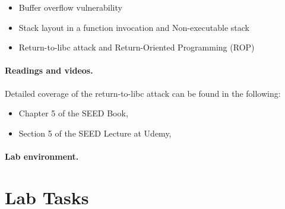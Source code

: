 \begin{itemize}[noitemsep]
\item Buffer overflow vulnerability
\item Stack layout in a function invocation and Non-executable stack 
\item Return-to-libc attack and Return-Oriented Programming (ROP)
\end{itemize}


\noindent
{}
 
\paragraph{Readings and videos.}
Detailed coverage of the return-to-libc attack can be found in the following:

\begin{itemize}
\item Chapter 5 of the SEED Book, \seedbook
\item Section 5 of the SEED Lecture at Udemy, \seedcsvideo
\end{itemize}


\paragraph{Lab environment.} \seedenvironment





\section{Lab Tasks}



